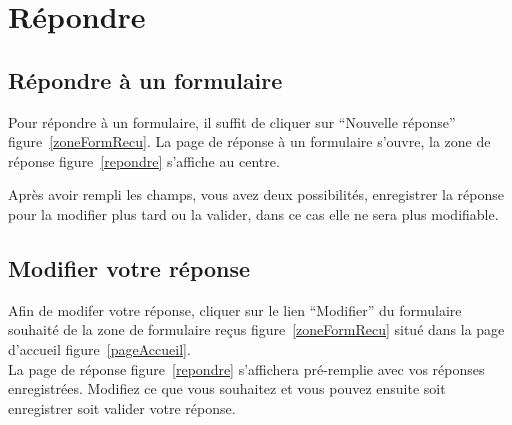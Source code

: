\documentclass[a4paper,11pt,final]{report}
\begin{document}
\chapter{Répondre}
\section{Répondre à un formulaire}
Pour répondre à un formulaire, il suffit de cliquer sur ``Nouvelle réponse'' figure~\ref{zoneFormRecu}. La page de réponse à un formulaire s'ouvre, la zone de réponse figure~\ref{repondre} s'affiche au centre.

\noindent\begin{minipage}{\linewidth}%
\label{repondre}
\end{minipage}

Après avoir rempli les champs, vous avez deux possibilités, enregistrer la réponse pour la modifier plus tard ou la valider, dans ce cas elle ne sera plus modifiable.

\section{Modifier votre réponse}
Afin de modifer votre réponse, cliquer sur le lien ``Modifier'' du formulaire souhaité de la zone de formulaire reçus figure~\ref{zoneFormRecu} situé dans la page d'accueil figure~\ref{pageAccueil}.\\
La page de réponse figure~\ref{repondre} s'affichera pré-remplie avec vos réponses enregistrées. Modifiez ce que vous souhaitez et vous pouvez ensuite soit enregistrer soit valider votre réponse.
\end{document}
